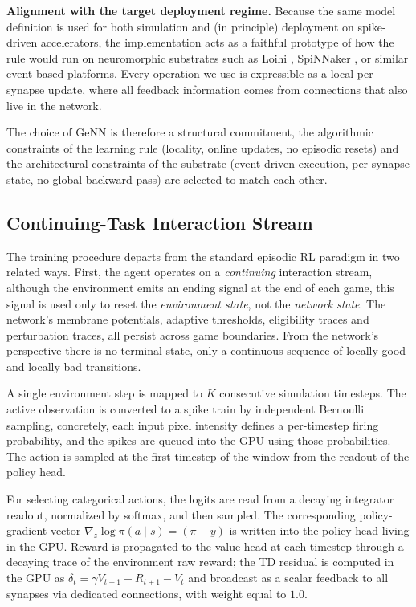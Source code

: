 \textbf{Alignment with the target deployment
regime.}
Because the same model definition is used for both
simulation and (in principle) deployment on
spike-driven accelerators, the implementation acts as a
faithful prototype of how the rule would run on
neuromorphic substrates such as Loihi \citep{Davies2018Loihi}, SpiNNaker \citep{Painkras2013SpiNNaker}, or similar event-based platforms. Every operation we use is
expressible as a local per-synapse update, where all feedback information comes from connections that also live in the network.

The choice of GeNN is therefore a structural commitment, the algorithmic constraints of the
learning rule (locality, online updates, no episodic resets)
and the architectural constraints of the substrate (event-driven
execution, per-synapse state, no global backward pass) are
selected to match each other.

\subsection{Continuing-Task Interaction Stream}
\label{subsec:training_loop}

The training procedure departs from the standard episodic RL
paradigm in two related ways. First, the agent operates on a
\emph{continuing} interaction stream, although the environment emits an ending signal at the end of
each game, this signal is used only to reset the
\emph{environment state}, not the \emph{network state}. The
network's membrane potentials, adaptive thresholds, eligibility
traces and perturbation traces, all persist
across game boundaries. From the network's perspective there is
no terminal state, only a continuous sequence of locally good
and locally bad transitions.

A single environment step is mapped to $K$ consecutive
simulation timesteps. The active observation is converted to a
spike train by independent Bernoulli sampling, concretely, each input pixel
intensity defines a per-timestep firing probability, and the
spikes are queued into the GPU using those probabilities. The
action is sampled at the first timestep of the window from the
readout of the policy head.

For selecting categorical actions, the logits are read from a decaying integrator readout, normalized by softmax, and then 
sampled. The corresponding policy-gradient vector
$\nabla_{z} \log \pi(a \mid s) = (\pi - y)$ is written into
the policy head living in the GPU. Reward is propagated to the value head at each timestep through a decaying trace 
of the environment raw reward; the TD residual is computed
in the GPU as
$\delta_t = \gamma V_{t+1} + R_{t+1} - V_{t}$
and broadcast as a scalar feedback to all
synapses via dedicated connections, with weight equal to $1.0$.

